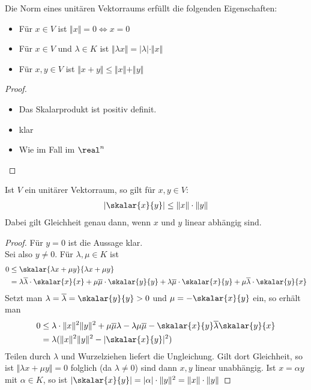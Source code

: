 \begin{proposition}
	Die Norm eines unitären Vektorraums erfüllt die folgenden Eigenschaften:
	\begin{itemize}
		\item Für $x\in V$ ist $\Vert x\Vert =0\iff x=0$
		\item Für $x\in V$ und $\lambda\in K$ ist $\Vert \lambda x\Vert=\vert \lambda\vert \cdot \Vert x\Vert$
		\item Für $x,y\in V$ ist $\Vert x+y\Vert \le \Vert x\Vert + \Vert y \Vert$
	\end{itemize}
\end{proposition}
\begin{proof}
	\begin{itemize}
		\item Das Skalarprodukt ist positiv definit.
		\item klar
		\item Wie im Fall im $\real^n$
	\end{itemize}
\end{proof}

\begin{proposition}
	Ist $V$ ein unitärer Vektorraum, so gilt für $x,y\in V$:
	\begin{align}
		\vert \skalar{x}{y}\vert \le \Vert x\Vert\cdot \Vert y\Vert\notag
	\end{align}
	Dabei gilt Gleichheit genau dann, wenn $x$ und $y$ linear abhängig sind.
\end{proposition}
\begin{proof}
	Für $y=0$ ist die Aussage klar. \\
	Sei also $y\neq 0$. Für $\lambda,\mu\in K$ ist 
	\begin{align}
		0&\le \skalar{\lambda x+\mu y}{\lambda x+\mu y}\notag \\
		&= \lambda\overline{\lambda}\cdot \skalar{x}{x}+\mu\overline{\mu}\cdot \skalar{y}{y}+\lambda\overline{\mu}\cdot \skalar{x}{y}+\mu\overline{\lambda}\cdot\skalar{y}{x}\notag
	\end{align}
	Setzt man $\lambda=\overline{\lambda}=\skalar{y}{y}>0$ und $\mu=-\skalar{x}{y}$ ein, so erhält man 
	\begin{align}
		0&\le \lambda\cdot\Vert x\Vert^2\Vert y\Vert^2 +\mu\overline{\mu}\lambda -\lambda\mu\overline{\mu}-\skalar{x}{y}\overline{\lambda}\skalar{y}{x}\notag \\
		&= \lambda(\Vert x\Vert^2\Vert y\Vert^2-\vert\skalar{x}{y}\vert^2)\notag
	\end{align}
	Teilen durch $\lambda$ und Wurzelziehen liefert die Ungleichung. Gilt dort Gleichheit, so ist $\Vert \lambda x+\mu y\Vert=0$ folglich (da $\lambda\neq 0$) sind dann $x,y$ linear unabhängig. Ist $x=\alpha y$ mit $\alpha\in K$, so ist $\vert\skalar{x}{y}\vert =\vert \alpha\vert \cdot \Vert y\Vert^2=\Vert x\Vert \cdot\Vert y\Vert$
\end{proof}